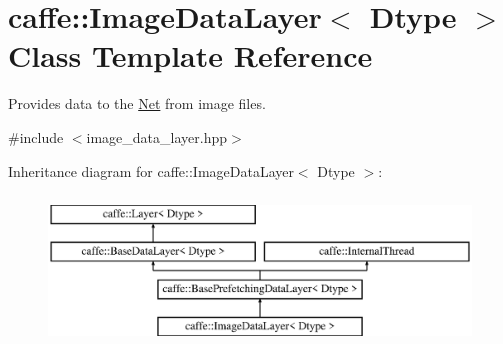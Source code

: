 \hypertarget{classcaffe_1_1ImageDataLayer}{}\section{caffe\+:\+:Image\+Data\+Layer$<$ Dtype $>$ Class Template Reference}
\label{classcaffe_1_1ImageDataLayer}


Provides data to the \hyperlink{classcaffe_1_1Net}{Net} from image files.  




{\ttfamily \#include $<$image\+\_\+data\+\_\+layer.\+hpp$>$}

Inheritance diagram for caffe\+:\+:Image\+Data\+Layer$<$ Dtype $>$\+:\begin{figure}[H]
\begin{center}
\leavevmode
\includegraphics[height=4.000000cm]{classcaffe_1_1ImageDataLayer}
\end{center}
\end{figure}
